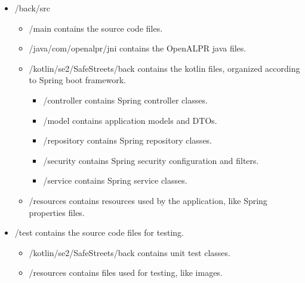 \begin{itemize}
    \item 
    /back/src
    \begin{itemize}[label={$\diamond$}]
        \item 
        /main \textcolor{black!70}{contains the source code files.}
        \item 
        /java/com/openalpr/jni \textcolor{black!70}{contains the OpenALPR java files.}
        \item 
        /kotlin/se2/SafeStreets/back \textcolor{black!70}{contains the kotlin files, organized according to Spring boot framework.}
        \begin{itemize}[label={\textbf{-}}]
            \item 
            /controller \textcolor{black!70}{contains Spring controller classes.}
            \item 
            /model \textcolor{black!70}{contains application models and DTOs.}
            \item 
            /repository \textcolor{black!70}{contains Spring repository classes.}
            \item 
            /security \textcolor{black!70}{contains Spring security configuration and filters.}
            \item 
            /service \textcolor{black!70}{contains Spring service classes.}
        \end{itemize}
        \item 
        /resources \textcolor{black!70}{contains resources used by the application, like Spring properties files.}
    \end{itemize}

    \item 
    /test \textcolor{black!70}{contains the source code files for testing.}
    \begin{itemize}[label={$\diamond$}]
        \item 
        /kotlin/se2/SafeStreets/back \textcolor{black!70}{contains unit test classes.}
        \item 
        /resources \textcolor{black!70}{contains files used for testing, like images.}
    \end{itemize}
\end{itemize}
